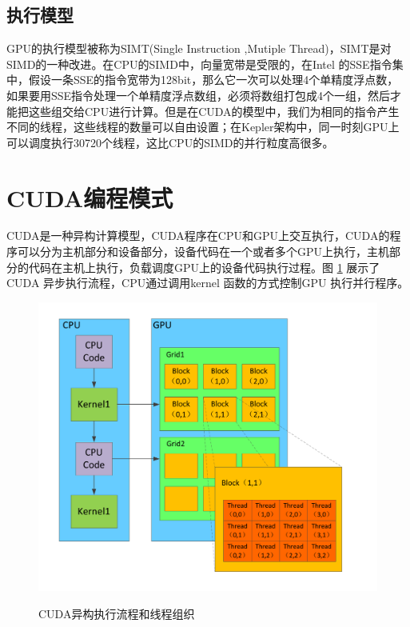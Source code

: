 \subsection{执行模型}
GPU的执行模型被称为SIMT(Single Instruction ,Mutiple Thread)，SIMT是对SIMD的一种改进\cite{CUDAR}。在CPU的SIMD中，向量宽带是受限的，在Intel 的SSE指令集中，假设一条SSE的指令宽带为128bit，那么它一次可以处理4个单精度浮点数，如果要用SSE指令处理一个单精度浮点数组，必须将数组打包成4个一组，然后才能把这些组交给CPU进行计算。但是在CUDA的模型中，我们为相同的指令产生不同的线程，这些线程的数量可以自由设置；在Kepler架构中，同一时刻GPU上可以调度执行30720个线程，这比CPU的SIMD的并行粒度高很多。

\section{CUDA编程模式}
CUDA是一种异构计算模型，CUDA程序在CPU和GPU上交互执行，CUDA的程序可以分为主机部分和设备部分，设备代码在一个或者多个GPU上执行，主机部分的代码在主机上执行，负载调度GPU上的设备代码执行过程。图 \ref{ktz}  展示了CUDA 异步执行流程，CPU通过调用kernel 函数的方式控制GPU 执行并行程序。
\begin{figure}
\setlength{\belowcaptionskip}{-0.5cm}
  \begin{center}
    {\includegraphics[width=1 \textwidth]{figures/block.pdf}}
    \end{center}
  \caption{{\footnotesize{CUDA异构执行流程和线程组织}}}
  \label{ktz}
\end{figure}
